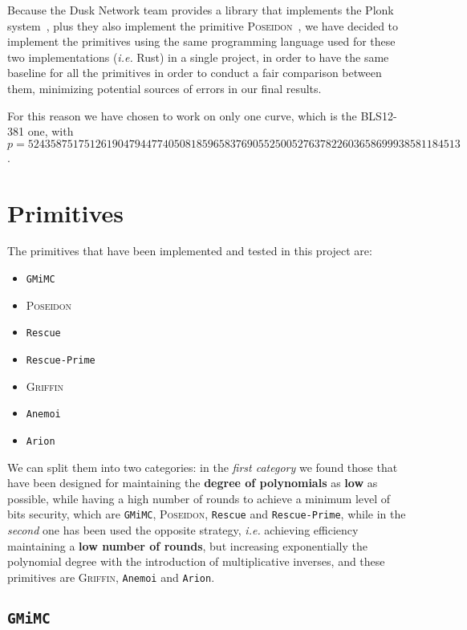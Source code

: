 \documentclass[12pt, a4paper]{report}
\begin{document}
Because the Dusk Network team provides a library that implements the \textsf{Plonk} system~\cite{dusk-plonk}, plus they also implement the primitive \textsc{Poseidon}~\cite{dusk-poseidon}, we have decided to implement the primitives using the same programming language used for these two implementations (\textsl{i.e.} Rust) in a single project, in order to have the same baseline for all the primitives in order to conduct a fair comparison between them, minimizing potential sources of errors in our final results.

For this reason we have chosen to work on only one curve, which is the BLS12-381 one, with $p = 52435875175126190479447740508185965837690552500527637822603658699938581184513$.

\section{Primitives}\label{sec:primitives}

The primitives that have been implemented and tested in this project are:
\begin{itemize}
  \item \texttt{GMiMC}\cite{gmimc}
  \item \textsc{Poseidon}\cite{poseidon}
  \item \texttt{Rescue}\cite{rescue}
  \item \texttt{Rescue-Prime}\cite{rescue-prime}
  \item \textsc{Griffin}\cite{griffin}
  \item \texttt{Anemoi}\cite{anemoi}
  \item \texttt{Arion}\cite{arion}
\end{itemize}

We can split them into two categories: in the \textit{first category} we found those that have been designed for maintaining the \textbf{degree of polynomials} as \textbf{low} as possible, while having a high number of rounds to achieve a minimum level of bits security, which are \texttt{GMiMC}, \textsc{Poseidon}, \texttt{Rescue} and \texttt{Rescue-Prime}, while in the \textit{second} one has been used the opposite strategy, \textsl{i.e.} achieving efficiency maintaining a \textbf{low number of rounds}, but increasing exponentially the polynomial degree with the introduction of multiplicative inverses, and these primitives are \textsc{Griffin}, \texttt{Anemoi} and \texttt{Arion}.

\subsection{\texttt{GMiMC}}\label{subsec:gmimc}
\end{document}
